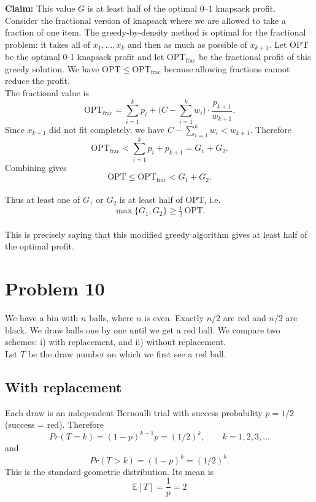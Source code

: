 \documentclass[a4paper]{article}
\begin{document}
\noindent \textbf{Claim:} This value $G$ is at least half of the optimal $0$--$1$ knapsack profit. \\

\noindent Consider the fractional version of knapsack where we are allowed to take a fraction of one item. The greedy-by-density method is optimal for the fractional problem: it takes all of $x_1,\ldots,x_k$ and then as much as possible of $x_{k+1}$. Let $\text{OPT}$ be the optimal 0-1 knapsack profit and let $\text{OPT}_{\text{frac}}$ be the fractional profit of this greedy solution. We have $\text{OPT} \le \text{OPT}_{\text{frac}}$ because allowing fractions cannot reduce the profit.\\

\noindent The fractional value is
\[
	\text{OPT}_{\text{frac}} = \sum_{i=1}^k p_i + \Big(C - \sum_{i=1}^k w_i\Big) \cdot \frac{p_{k+1}}{w_{k+1}}.
\]
Since $x_{k+1}$ did not fit completely, we have $C - \sum_{i=1}^k w_i < w_{k+1}$. Therefore
\[
	\text{OPT}_{\text{frac}} < \sum_{i=1}^k p_i + p_{k+1} = G_1 + G_2.
\]
Combining gives
\[
	\text{OPT} \le \text{OPT}_{\text{frac}} < G_1 + G_2.
\]\\
Thus at least one of $G_1$ or $G_2$ is at least half of $\text{OPT}$, i.e.
\[
\max\{G_1, G_2\} \ge \tfrac{1}{2}\, \text{OPT}.
\]\\

\noindent This is precisely saying that this modified greedy algorithm gives at least half of the optimal profit. \\

\newpage \section*{Problem 10}

We have a bin with $n$ balls, where $n$ is even. Exactly $n/2$ are red and $n/2$ are black. We draw balls one by one until we get a red ball. We compare two schemes: i) with replacement, and ii) without replacement.\\

\noindent Let $T$ be the draw number on which we first see a red ball.

\subsection*{With replacement}
Each draw is an independent Bernoulli trial with success probability $p = 1/2$ (success = red). Therefore
\[Pr(T = k) = (1-p)^{k-1} p = (1/2)^k, \qquad k = 1,2,3,\ldots\]
and
\[Pr(T > k) = (1-p)^k = (1/2)^k.\]
This is the standard geometric distribution. Its mean is
\[\mathbb{E}[T] = \frac{1}{p} = 2\]
\end{document}
